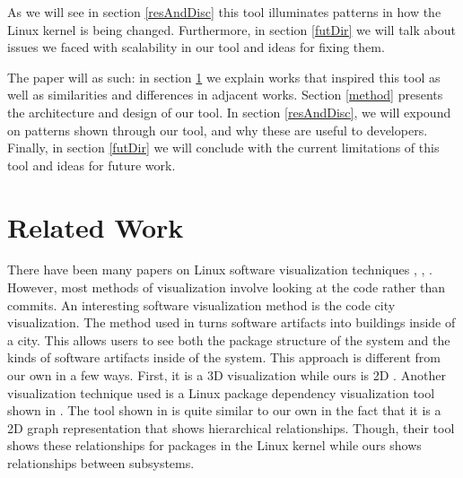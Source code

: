 \documentclass[conference]{IEEEtran}
\begin{document}

As we will see in section \ref{resAndDisc} this tool illuminates patterns in how the Linux kernel is being changed. Furthermore, in section \ref{futDir} we will talk about issues we faced with scalability in our tool and ideas for fixing them.

The paper will as such: in section \ref{relWork} we explain works that inspired this tool as well as similarities and differences in adjacent works. Section \ref{method} presents the architecture and design of our tool. In section \ref{resAndDisc}, we will expound on patterns shown through our tool, and why these are useful to developers. Finally, in section \ref{futDir} we will conclude with the current limitations of this tool and ideas for future work.




\section{Related Work}
\label{relWork}


There have been many papers on Linux software visualization techniques \cite{jayara}, \cite{cityVR}, \cite{visLin}. However, most methods of visualization involve looking at the code rather than commits. An interesting software visualization method is the code city visualization. The method used in \cite{visLin} turns software artifacts into buildings inside of a city. This allows users to see both the package structure of the system and the kinds of software artifacts inside of the system. This approach is different from our own in a few ways. First, it is a 3D visualization while ours is 2D \cite{visLin}. Another visualization technique used is a Linux package dependency visualization tool shown in \cite{mithun}. The tool shown in \cite{mithun} is quite similar to our own in the fact that it is a 2D graph representation that shows hierarchical relationships. Though, their tool shows these relationships for packages in the Linux kernel while ours shows relationships between subsystems. 
\end{document}
